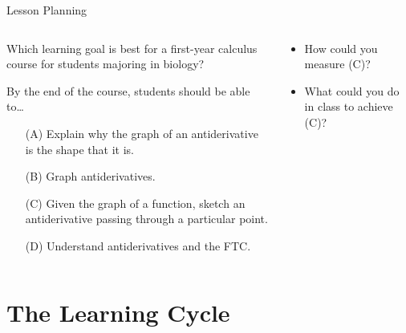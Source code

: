 \documentclass[10pt, aspectratio=169, t]{beamer}
\begin{document}
\begin{frame}{Lesson Planning}

\begin{columns}
\begin{column}{0.5\textwidth}
	Which learning goal is best for a first-year calculus course for students majoring in biology?

	\bigskip
	\begin{block}{By the end of the course, students should be able to\ldots
		}
	\begin{enumerate}
		\item[(A)] Explain why the graph of an antiderivative is the shape that it is.
		\item[(B)] Graph antiderivatives.
		\item[(C)] Given the graph of a function, sketch an antiderivative passing through a particular point.
		\item[(D)] Understand antiderivatives and the FTC.
	\end{enumerate}
	\end{block}
\end{column}
\begin{column}{0.5\textwidth}  %
	\pause
	\large
	\begin{itemize}
		\item How could you \alert{measure} (C)?
		
		\pause

		\item What could you \alert{do in class} to achieve (C)?
	\end{itemize}
\end{column}
\end{columns}
\end{frame}





\section{The Learning Cycle}

\end{document}
